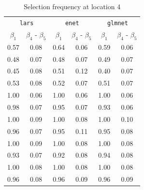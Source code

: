 \documentclass[authoryear, review, 11pt]{elsarticle}
\begin{document}
		\begin{table}[ht]
		\begin{center}
		\begin{tabular}{cc|cc|cc}
		\multicolumn{2}{c}{\texttt{lars}} & \multicolumn{2}{c}{\texttt{enet}} & \multicolumn{2}{c}{\texttt{glmnet}} \\
		 $\beta_1$ & $\beta_4$ - $\beta_5$ & $\beta_1$ & $\beta_4$ - $\beta_5$ & $\beta_1$ & $\beta_4$ - $\beta_5$ \\ 
		  \hline
		0.57 & 0.08 & 0.64 & 0.06 & 0.59 & 0.06 \\ 
		  0.48 & 0.07 & 0.48 & 0.07 & 0.49 & 0.07 \\ 
		  0.45 & 0.08 & 0.51 & 0.12 & 0.40 & 0.07 \\ 
		  0.53 & 0.08 & 0.52 & 0.07 & 0.51 & 0.07 \\ 
		  \hline
		  1.00 & 0.06 & 1.00 & 0.06 & 1.00 & 0.06 \\ 
		  0.98 & 0.07 & 0.95 & 0.07 & 0.93 & 0.06 \\ 
		  1.00 & 0.09 & 1.00 & 0.08 & 1.00 & 0.10 \\ 
		  0.96 & 0.07 & 0.95 & 0.11 & 0.95 & 0.08 \\ 
		  \hline
		  1.00 & 0.09 & 1.00 & 0.08 & 1.00 & 0.08 \\ 
		  0.93 & 0.07 & 0.92 & 0.08 & 0.94 & 0.08 \\ 
		  1.00 & 0.08 & 1.00 & 0.08 & 1.00 & 0.08 \\ 
		  0.96 & 0.08 & 0.96 & 0.09 & 0.96 & 0.09 \\ 
		  \end{tabular}
		\caption{Selection frequency at location 4\label{table:loc4-selection}}
		\end{center}
		\end{table}
\end{document}
